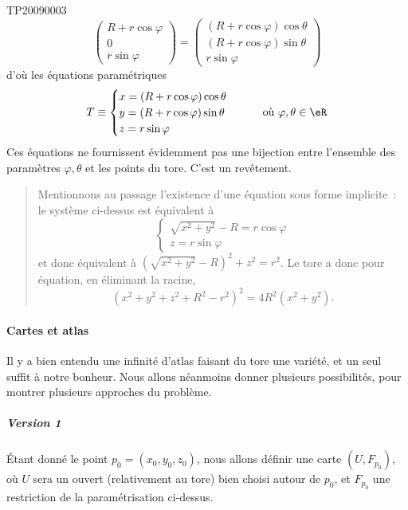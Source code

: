\begin{corrige}{TP20090003}
\begin{equation*}
\begin{pmatrix}
    R + r\cos \varphi\\
    0\\
    r \sin \varphi
  \end{pmatrix}
  =
  \begin{pmatrix}
   (R + r\cos \varphi) \cos \theta\\
   (R + r\cos \varphi) \sin \theta\\
   r \sin \varphi
  \end{pmatrix}
\end{equation*}
d'où les équations paramétriques
\begin{equation}\label{torus_parameq}
  T \equiv
  \begin{cases}
    x = (R + r\cos \varphi) \cos \theta\\
    y = (R + r\cos \varphi) \sin \theta\\
    z = r \sin \varphi
  \end{cases} \qquad \text{où $\varphi,\theta \in \eR$}
\end{equation}
Ces équations ne fournissent évidemment pas une bijection entre
l'ensemble des paramètres $\varphi,\theta$ et les points du tore. C'est
un revêtement.

\begin{quote}
  Mentionnons au passage l'existence d'une équation sous forme
  implicite~: le système ci-dessus est équivalent à
  \begin{equation*}
    \begin{cases}
      \sqrt{x^2+y^2} - R = r \cos \varphi\\
      z = r \sin \varphi
    \end{cases}
  \end{equation*}
  et donc équivalent à $(\sqrt{x^2+y^2} - R)^2 + z^2 = r^2$. Le tore a
  donc pour équation, en éliminant la racine,
  \begin{equation*}
    (x^2 + y^2 + z^2 + R^2 - r^2)^2 = 4 R^2 (x^2+y^2).
  \end{equation*}
\end{quote}

\paragraph{Cartes et atlas}
Il y a bien entendu une infinité d'atlas faisant du tore une variété,
et un seul suffit à notre bonheur. Nous allons néanmoins donner
plusieurs possibilités, pour montrer plusieurs approches du
problème.

\subparagraph{Version 1} Étant donné le point $p_0 = (x_0,y_0,z_0)$,
nous allons définir une carte $(U,F_{p_0})$, où $U$ sera un ouvert
(relativement au tore) bien choisi autour de $p_0$, et $F_{p_0}$ une
restriction de la paramétrisation ci-dessus.


\end{corrige}
